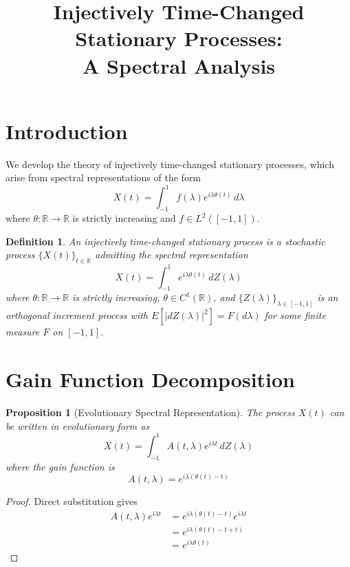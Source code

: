 \documentclass[11pt]{article}
\title{Injectively Time-Changed Stationary Processes:\\ A Spectral Analysis}
\author{}
\date{}
\newtheorem{proposition}{Proposition}
\newtheorem{definition}{Definition}
\begin{document}
\maketitle

\section{Introduction}

We develop the theory of injectively time-changed stationary processes, which arise from spectral representations of the form
\begin{equation}
X(t) = \int_{-1}^1 f(\lambda) e^{i\lambda\theta(t)} \, d\lambda
\end{equation}
where $\theta: \mathbb{R} \to \mathbb{R}$ is strictly increasing and $f \in L^2([-1,1])$.

\begin{definition}
An \emph{injectively time-changed stationary process} is a stochastic process $\{X(t)\}_{t \in \mathbb{R}}$ admitting the spectral representation
\begin{equation}
X(t) = \int_{-1}^1 e^{i\lambda\theta(t)} \, dZ(\lambda)
\end{equation}
where $\theta: \mathbb{R} \to \mathbb{R}$ is strictly increasing, $\theta \in C^1(\mathbb{R})$, and $\{Z(\lambda)\}_{\lambda \in [-1,1]}$ is an orthogonal increment process with $E[|dZ(\lambda)|^2] = F(d\lambda)$ for some finite measure $F$ on $[-1,1]$.
\end{definition}

\section{Gain Function Decomposition}

\begin{proposition}[Evolutionary Spectral Representation]
The process $X(t)$ can be written in evolutionary form as
\begin{equation}
X(t) = \int_{-1}^1 A(t,\lambda) e^{i\lambda t} \, dZ(\lambda)
\end{equation}
where the gain function is
\begin{equation}
A(t,\lambda) = e^{i\lambda(\theta(t)-t)}
\end{equation}
\end{proposition}

\begin{proof}
Direct substitution gives
\begin{align}
A(t,\lambda) e^{i\lambda t} &= e^{i\lambda(\theta(t)-t)} e^{i\lambda t}\\
&= e^{i\lambda(\theta(t)-t+t)}\\
&= e^{i\lambda\theta(t)}
\end{align}
\end{proof}
\end{document}
